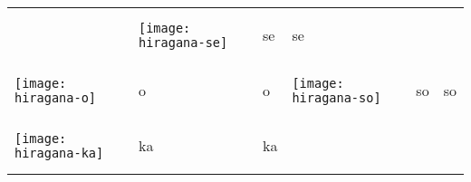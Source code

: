 \documentclass[a4paper,12pt]{extarticle}
\begin{document}
\begin{longtable}{|lll|lll|}
	                                   &
	\begin{minipage}{0.2\textwidth}
		\centerline{
			\texttt{[image: hiragana-se]}
		}
	\end{minipage}
	                                   &
	\begin{CJK}{UTF8}{min}se\end{CJK}
	                                   &
	se
	\\
	\begin{minipage}{0.2\textwidth}
		\centerline{
			\texttt{[image: hiragana-o]}
		}
	\end{minipage}
	                                   &
	\begin{CJK}{UTF8}{min}o\end{CJK}
	                                   &
	o

	                                   &
	\begin{minipage}{0.2\textwidth}
		\centerline{
			\texttt{[image: hiragana-so]}
		}
	\end{minipage}
	                                   &
	\begin{CJK}{UTF8}{min}so\end{CJK}
	                                   &
	so
	\\
	\begin{minipage}{0.2\textwidth}
		\centerline{
			\texttt{[image: hiragana-ka]}
		}
	\end{minipage}
	                                   &
	\begin{CJK}{UTF8}{min}ka\end{CJK}
	                                   &
	ka


\end{longtable}
\end{document}
